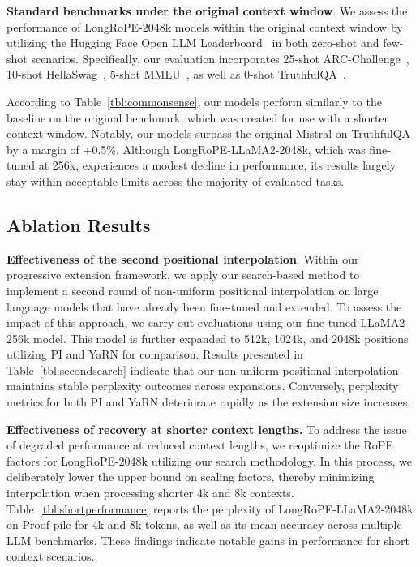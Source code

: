 \textbf{Standard benchmarks under the original context window}. We assess the performance of LongRoPE-2048k models within the original context window by utilizing the Hugging Face Open LLM Leaderboard~\cite{huggingfaceboard} in both zero-shot and few-shot scenarios. Specifically, our evaluation incorporates 25-shot ARC-Challenge~\cite{allenai:arc}, 10-shot HellaSwag~\cite{zellers2019hellaswag}, 5-shot MMLU~\cite{mmlu}, as well as 0-shot TruthfulQA~\cite{lin2021truthfulqa}.

According to Table~\ref{tbl:commonsense}, our models perform similarly to the baseline on the original benchmark, which was created for use with a shorter context window. Notably, our models surpass the original Mistral on TruthfulQA by a margin of +0.5\%. Although LongRoPE-LLaMA2-2048k, which was fine-tuned at 256k, experiences a modest decline in performance, its results largely stay within acceptable limits across the majority of evaluated tasks.

\subsection{Ablation Results}

\textbf{Effectiveness of the second positional interpolation}. Within our progressive extension framework, we apply our search-based method to implement a second round of non-uniform positional interpolation on large language models that have already been fine-tuned and extended. To assess the impact of this approach, we carry out evaluations using our fine-tuned LLaMA2-256k model. This model is further expanded to 512k, 1024k, and 2048k positions utilizing PI and YaRN for comparison. Results presented in Table~\ref{tbl:secondsearch} indicate that our non-uniform positional interpolation maintains stable perplexity outcomes across expansions. Conversely, perplexity metrics for both PI and YaRN deteriorate rapidly as the extension size increases.

\textbf{Effectiveness of recovery at shorter context lengths.} To address the issue of degraded performance at reduced context lengths, we reoptimize the RoPE factors for LongRoPE-2048k utilizing our search methodology. In this process, we deliberately lower the upper bound on scaling factors, thereby minimizing interpolation when processing shorter 4k and 8k contexts. Table~\ref{tbl:shortperformance} reports the perplexity of LongRoPE-LLaMA2-2048k on Proof-pile for 4k and 8k tokens, as well as its mean accuracy across multiple LLM benchmarks. These findings indicate notable gains in performance for short context scenarios.

